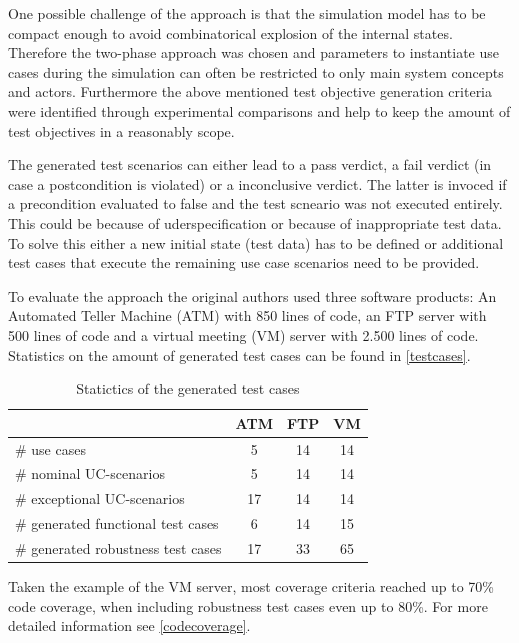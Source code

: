 One possible challenge of the approach is that the simulation model has to be compact enough to avoid combinatorical explosion of the internal states. Therefore the two-phase approach was chosen and parameters to instantiate use cases during the simulation can often be restricted to only main system concepts and actors. Furthermore the above mentioned test objective generation criteria were identified through experimental comparisons and help to keep the amount of test objectives in a reasonably scope. 

The generated test scenarios can either lead to a pass verdict, a fail verdict (in case a postcondition is violated) or a inconclusive verdict. The latter is invoced if a precondition evaluated to false and the test scneario was not executed entirely. This could be because of uderspecification or because of inappropriate test data. To solve this either a new initial state (test data) has to be defined or additional test cases that execute the remaining use case scenarios need to be provided. 

To evaluate the approach the original authors used three software products: An Automated Teller Machine (ATM) with 850 lines of code, an FTP server with 500 lines of code and a virtual meeting (VM) server with 2.500 lines of code. Statistics on the amount of generated test cases can be found in \autoref{testcases}.

\begin{table}[h] 
	\centering
	\begin{small}
		\caption{Statictics of the generated test cases}
		\label{testcases}
		\setlength{\tabcolsep}{1em}
		\begin{tabular}{l|c|c|c}
			\hline
			& \textbf{ATM} & \textbf{FTP} & \textbf{VM} \\
			\hline
			\hline	
			\# use cases & 5 & 14 & 14 \\
			\hline
			\# nominal UC-scenarios & 5 & 14 & 14 \\
			\hline
			\# exceptional UC-scenarios & 17 & 14 & 14 \\
			\hline
			\# generated functional test cases & 6 & 14 & 15 \\
			\hline
			\# generated robustness test cases & 17 & 33 & 65 \\
			\hline
		\end{tabular}
	\end{small}
\end{table}

Taken the example of the VM server, most coverage criteria reached up to 70\% code coverage, when including robustness test cases even up to 80\%. For more detailed information see \autoref{codecoverage}.

